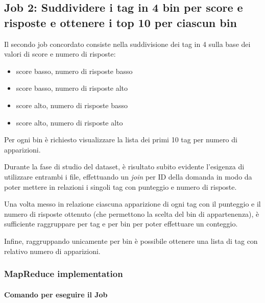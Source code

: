 

\subsection[%
    Job 2: Suddividere tag in base a score e risposte%
  ]{%
    Job 2: Suddividere i tag in 4 bin per score e risposte e ottenere i top 10 per ciascun bin%
  }\label{subsec:job2}

  Il secondo job concordato consiste nella suddivisione dei tag in 4 sulla base dei valori di score e numero di risposte:

  \begin{itemize}
    \item score basso, numero di risposte basso
    \item score basso, numero di risposte alto
    \item score alto, numero di risposte basso
    \item score alto, numero di risposte alto
  \end{itemize}

  Per ogni bin è richiesto visualizzare la lista dei primi 10 tag per numero di apparizioni.

  Durante la fase di studio del dataset, è risultato subito evidente l'esigenza di utilizzare entrambi i file,
  effettuando un \textit{join} per ID della domanda in modo da poter mettere in relazioni i singoli tag con punteggio e numero di risposte.

  Una volta messo in relazione ciascuna apparizione di ogni tag con il punteggio e il numero di risposte ottenuto (che permettono la scelta del bin di appartenenza),
  è sufficiente raggruppare per tag e per bin per poter effettuare un conteggio.

  Infine, raggruppando unicamente per bin è possibile ottenere una lista di tag con relativo numero di apparizioni.

  \subsubsection{MapReduce implementation}\label{subsub:job2:mapreduce}

  \paragraph{Comando per eseguire il Job}\label{par:job2:mapreduce:cmd}

